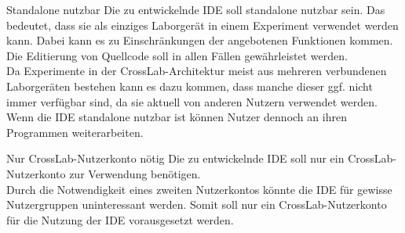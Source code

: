 \begin{requirement}{Standalone nutzbar}
  \reqdescription Die zu entwickelnde IDE soll standalone nutzbar sein. Das bedeutet, dass sie als einziges Laborgerät in einem Experiment verwendet werden kann. Dabei kann es zu Einschränkungen der angebotenen Funktionen kommen. Die Editierung von Quellcode soll in allen Fällen gewährleistet werden. \\
  \reqrationale Da Experimente in der CrossLab-Architektur meist aus mehreren verbundenen Laborgeräten bestehen kann es dazu kommen, dass manche dieser ggf. nicht immer verfügbar sind, da sie aktuell von anderen Nutzern verwendet werden. Wenn die IDE standalone nutzbar ist können Nutzer dennoch an ihren Programmen weiterarbeiten. \\
\end{requirement}

\begin{requirement}{Nur CrossLab-Nutzerkonto nötig}
  \reqdescription Die zu entwickelnde IDE soll nur ein CrossLab-Nutzerkonto zur Verwendung benötigen. \\
  \reqrationale Durch die Notwendigkeit eines zweiten Nutzerkontos könnte die IDE für gewisse Nutzergruppen uninteressant werden. Somit soll nur ein CrossLab-Nutzerkonto für die Nutzung der IDE vorausgesetzt werden. \\
\end{requirement}



